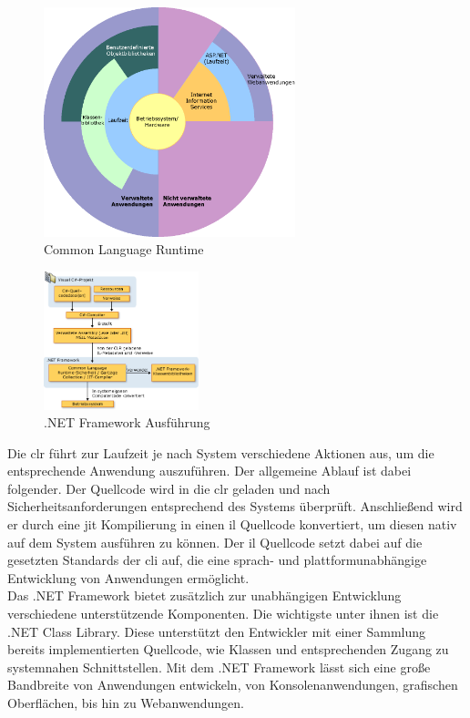 \begin{figure}[h]
	\centering
	\includegraphics[width=0.65\textwidth]{images/technische_grundlagen/clr.png}
	\caption{Common Language Runtime}
	\label{fig:clr}
\end{figure}

\begin{figure}
	\begin{center}
		\includegraphics[width=0.4\textwidth]{images/technische_grundlagen/net_aufbau.jpeg}
	\end{center}
	\caption{.NET Framework Ausführung}
	\label{fig:net}
\end{figure}

\noindent
Die \gls{clr} führt zur Laufzeit je nach System verschiedene Aktionen aus, um die entsprechende Anwendung auszuführen. Der allgemeine Ablauf ist dabei folgender. Der Quellcode wird in die \gls{clr} geladen und nach Sicherheitsanforderungen entsprechend des Systems überprüft. Anschließend wird er durch eine \gls{jit} Kompilierung in einen \gls{il} Quellcode konvertiert, um diesen nativ auf dem System ausführen zu können. Der \gls{il} Quellcode setzt dabei auf die gesetzten Standards der \gls{cli} auf, die eine sprach- und plattformunabhängige Entwicklung von Anwendungen ermöglicht.\\
Das .NET Framework bietet zusätzlich zur unabhängigen Entwicklung verschiedene unterstützende Komponenten. Die wichtigste unter ihnen ist die .NET Class Library. Diese unterstützt den Entwickler mit einer Sammlung bereits implementierten Quellcode, wie Klassen und entsprechenden Zugang zu systemnahen Schnittstellen. Mit dem .NET Framework lässt sich eine große Bandbreite von Anwendungen entwickeln, von Konsolenanwendungen, grafischen Oberflächen, bis hin zu Webanwendungen.\\

